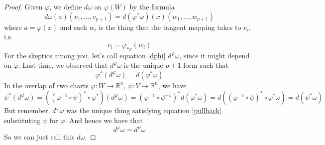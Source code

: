 \documentclass{article}
\newcommand{\reals}[0]{\mathbb{R}}
\begin{document}
\begin{proof}
  Given \(\varphi\), we define \(d\omega\) on \(\varphi(W)\) by the formula
  \begin{equation}
    d\omega(a)(v_1,...,v_{p + 1}) = d(\varphi^*\omega)(x)(w_1,...,w_{p + 1})
    \label{dphi}
  \end{equation}
  where \(a = \varphi(x)\) and each \(w_i\) is the thing that the tangent mapping takes to \(v_i\), i.e.
  \begin{equation}
    v_i = \varphi_{*x}(w_i)
  \end{equation}
  For the skeptics among you, let's call equation \ref{dphi} \(d^\varphi\omega\), since it might depend on \(\varphi\). Last time, we observed that \(d^\varphi\omega\) is the unique \(p + 1\) form such that
  \begin{equation}
    \varphi^*(d^\varphi\omega) = d(\varphi^*\omega) \label{pullback}
  \end{equation}
  In the overlap of two charts \(\varphi: W \to \reals^n\), \(\psi: V \to \reals^n\), we have
  \begin{equation}
    \psi^*(d^\varphi\omega) = ((\varphi^{-1} \circ \psi)^* \circ \varphi^*)(d^\varphi\omega) = (\varphi^{-1} \circ \psi^{-1})^*d(\varphi^*\omega) = d((\varphi^{-1} \circ \psi)^* \circ \varphi^*\omega) = d(\psi^*\omega)
  \end{equation}
  But remember, \(d^\psi\omega\) was the unique thing satisfying equation \ref{pullback} substituting \(\psi\) for \(\varphi\). And hence we have that
  \begin{equation}
    d^\varphi\omega = d^\psi\omega
  \end{equation}
  So we can just call this \(d\omega\).
\end{proof}
\end{document}
